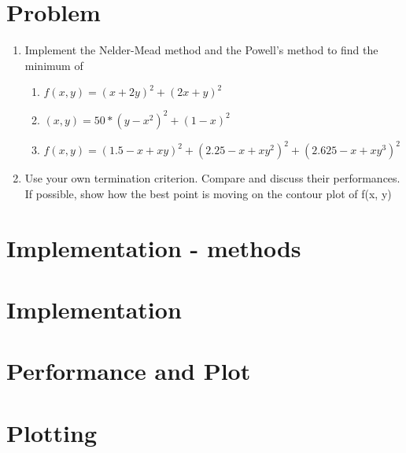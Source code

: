 \documentclass[12pt,letterpaper]{article}
\begin{document}
\section*{Problem}

\begin{enumerate}
  \item Implement the Nelder-Mead method and the Powell's method to find the minimum of
  \begin{enumerate}
    \item $f(x, y)=(x+2y)^2 + (2x+y)^2$
    \item $(x, y)=50*(y-x^2)^2 + (1-x)^2$
    \item $f(x, y)=(1.5-x+xy)^2 + (2.25-x+xy^2)^2 + (2.625 - x+ xy^3)^2$
  \end{enumerate}
  \item Use your own termination criterion. Compare and discuss their performances. 
  If possible, show how the best point is moving on the contour plot of f(x, y)
\end{enumerate}

\section*{Implementation - methods}


\newpage
\section*{Implementation}


\newpage
\section*{Performance and Plot}


\newpage
\section*{Plotting}

\end{document}
